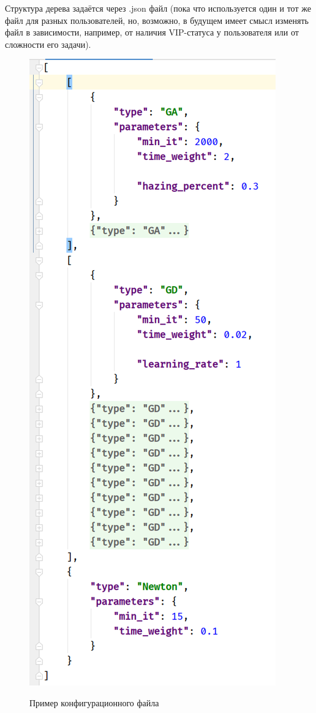 \documentclass[11pt]{article}
\begin{document}
    Структура дерева задаётся через .json файл
    (пока что используется один и тот же файл для разных пользователей, но, возможно,
    в будущем имеет смысл изменять файл в зависимости, например, от наличия VIP-статуса у пользователя или от сложности его задачи).

    \begin{figure}[h]
        \centering
        \includegraphics[height=0.4\textheight]{opt-tree-json.png}
        \label{fig:opt-tree-config}
        \caption{Пример конфигурационного файла}
    \end{figure}
    \FloatBarrier
\end{document}
